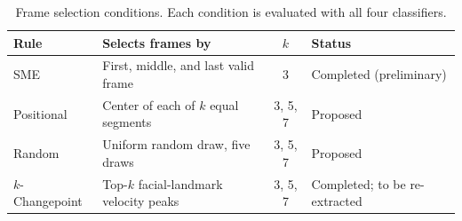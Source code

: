 \begin{table}[t]
   \centering
   \caption{Frame selection conditions. Each condition is evaluated with all four classifiers.}
   \label{tab:conditions}
   \begin{tabular}{lL{4.6cm}cL{3.4cm}}
      \toprule
      Rule & Selects frames by & $k$ & Status \\
      \midrule
      SME & First, middle, and last valid frame & 3 & Completed (preliminary) \\
      Positional & Center of each of $k$ equal segments & 3, 5, 7 & Proposed \\
      Random & Uniform random draw, five draws & 3, 5, 7 & Proposed \\
      $k$-Changepoint & Top-$k$ facial-landmark velocity peaks & 3, 5, 7 & Completed; to be re-extracted \\
      \bottomrule
   \end{tabular}
\end{table}

